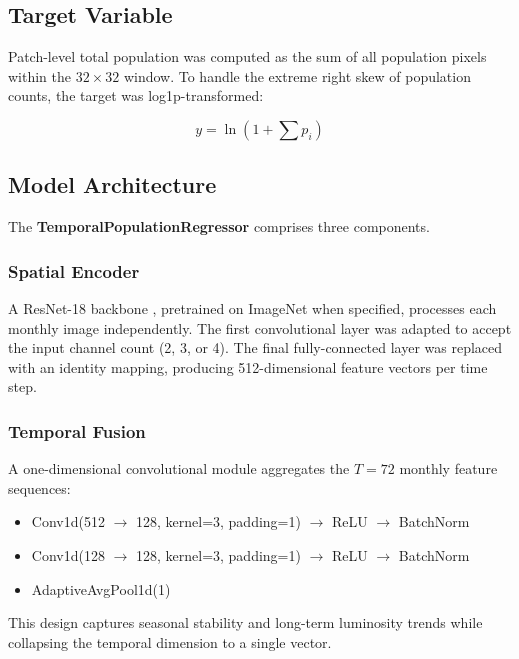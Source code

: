 \documentclass[conference]{IEEEtran}
\begin{document}
\subsection{Target Variable}
\label{subsec:target}

Patch-level total population was computed as the sum of all population pixels within the $32 \times 32$ window. To handle the extreme right skew of population counts, the target was log1p-transformed:

\begin{equation}
    y = \ln(1 + \sum p_i)
\end{equation}

\subsection{Model Architecture}
\label{subsec:architecture}

The \textbf{TemporalPopulationRegressor} comprises three components.

\subsubsection{Spatial Encoder}

A ResNet-18 backbone \cite{he2016resnet}, pretrained on ImageNet when specified, processes each monthly image independently. The first convolutional layer was adapted to accept the input channel count (2, 3, or 4). The final fully-connected layer was replaced with an identity mapping, producing 512-dimensional feature vectors per time step.

\subsubsection{Temporal Fusion}

A one-dimensional convolutional module aggregates the $T = 72$ monthly feature sequences:

\begin{itemize}
    \item Conv1d(512 $\rightarrow$ 128, kernel=3, padding=1) $\rightarrow$ ReLU $\rightarrow$ BatchNorm
    \item Conv1d(128 $\rightarrow$ 128, kernel=3, padding=1) $\rightarrow$ ReLU $\rightarrow$ BatchNorm
    \item AdaptiveAvgPool1d(1)
\end{itemize}

This design captures seasonal stability and long-term luminosity trends while collapsing the temporal dimension to a single vector.
\end{document}
